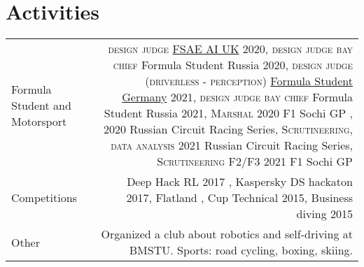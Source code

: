 \section*{\sectionformat Activities}
\begin{tabular}{@{}L!{\VRule}R}
    Formula Student and Motorsport &
    {\textsc{design judge}} \href{https://www.imeche.org/events/formula-student/team-information/fs-ai}{FSAE AI UK} 2020,
    {\textsc{design judge bay chief}} Formula Student Russia 2020,
    {\textsc{design judge (driverless - perception)}} \href{https://www.formulastudent.de/fsg/}{Formula Student Germany} 2021,
    {\textsc{design judge bay chief}} Formula Student Russia 2021,
    {\textsc{Marshal}} 2020 F1 Sochi GP , 2020 Russian Circuit Racing Series,
    {\textsc{Scrutineering, data analysis}} 2021 Russian Circuit Racing Series,
    {\textsc{Scrutineering F2/F3}} 2021 F1 Sochi GP
    \\
    Competitions                   &
    Deep Hack RL 2017 ,
    Kaspersky DS hackaton 2017,
    Flatland ,
    Cup Technical 2015,
    Business diving 2015
    \\
    Other                          &
    Organized a club about robotics and self-driving at BMSTU.
    Sports: road cycling, boxing, skiing.
\end{tabular}